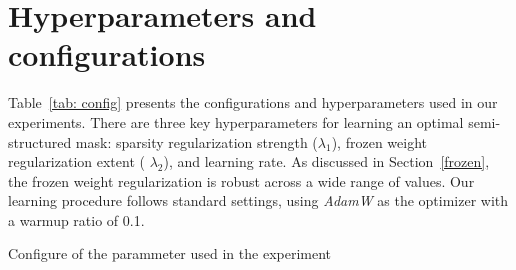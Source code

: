 \fi

\section{Hyperparameters and configurations}
\label{config}
Table~\ref{tab: config} presents the configurations and hyperparameters used in our experiments. There are three key hyperparameters for learning an optimal semi-structured mask: sparsity regularization strength ($\lambda_{1}$), frozen weight regularization extent (
$\lambda_{2}$), and learning rate. As discussed in Section~\ref{frozen}, the frozen weight regularization is robust across a wide range of values. Our learning procedure follows standard settings, using \textit{AdamW} as the optimizer with a warmup ratio of 0.1.

\begin{table}[H]
\centering
\caption{Configure of the parammeter used in the experiment}
\label{tab: config}
\end{table}


